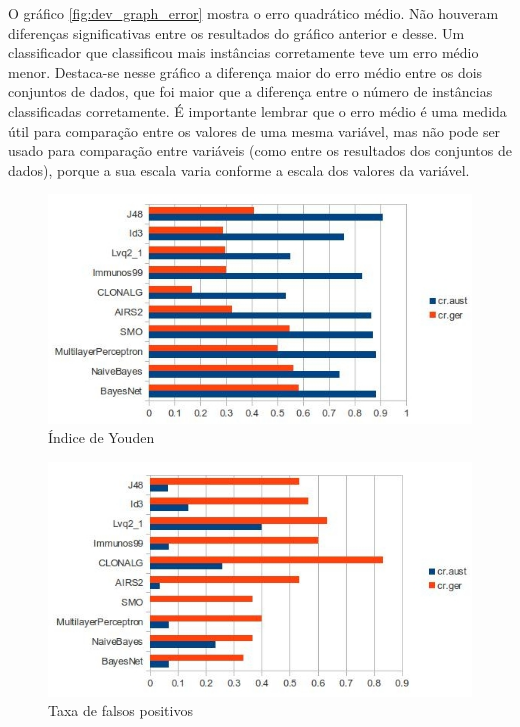 O gráfico \ref{fig:dev_graph_error} mostra o erro quadrático médio. Não houveram diferenças significativas entre os resultados do gráfico anterior e desse. Um classificador que classificou mais instâncias corretamente teve um erro médio menor. Destaca-se nesse gráfico a diferença maior do erro médio entre os dois conjuntos de dados, que foi maior que a diferença entre o número de instâncias classificadas corretamente. É importante lembrar que o erro médio é uma medida útil para comparação entre os valores de uma mesma variável, mas não pode ser usado para comparação entre variáveis (como entre os resultados dos conjuntos de dados), porque a sua escala varia conforme a escala dos valores da variável.

\begin{figure}[h]
    \centering
    \caption{Índice de Youden}
    \label{fig:dev_graph_youden}
    \includegraphics[width=1\textwidth]{img/graph_youden.jpg}
\end{figure}

\begin{figure}[h]
    \centering
    \caption{Taxa de falsos positivos}
    \label{fig:dev_graph_false_pos}
    \includegraphics[width=1\textwidth]{img/graph_false_pos.jpg}
\end{figure}

